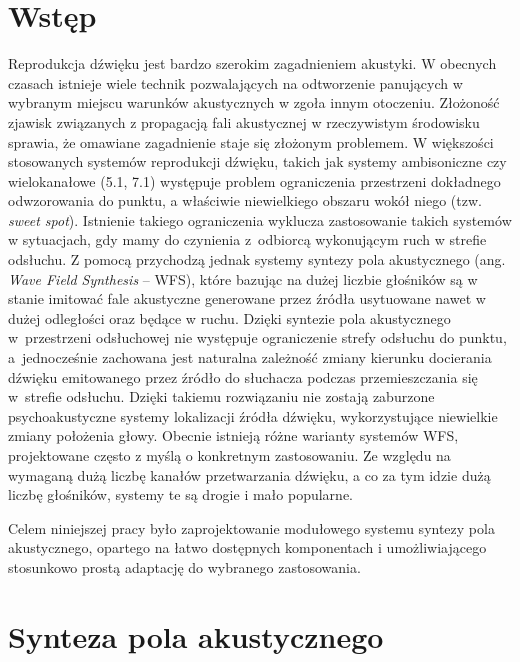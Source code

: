 \documentclass[12pt]{oska}
\affiliation{Akademia Górniczo-Hutnicza im. Stanisława Staszica w Krakowie}
\let\Oldsection\section
\renewcommand{\section}{\FloatBarrier\Oldsection}
\begin{document}
\maketitles

\section{Wstęp}

Reprodukcja dźwięku jest bardzo szerokim zagadnieniem akustyki. W obecnych
czasach istnieje wiele technik pozwalających na odtworzenie panujących w
wybranym miejscu warunków akustycznych w zgoła innym otoczeniu. Złożoność
zjawisk związanych z propagacją fali akustycznej w rzeczywistym środowisku
sprawia, że omawiane zagadnienie staje się złożonym problemem. 
W większości stosowanych systemów reprodukcji dźwięku, takich jak systemy 
ambisoniczne czy wielokanałowe (5.1, 7.1) występuje problem
ograniczenia przestrzeni dokładnego odwzorowania do
punktu, a właściwie niewielkiego obszaru wokół niego (tzw. \textit{sweet spot}).
Istnienie takiego ograniczenia wyklucza zastosowanie takich systemów w
sytuacjach, gdy mamy do czynienia z~odbiorcą wykonującym ruch w strefie
odsłuchu. Z pomocą przychodzą jednak systemy syntezy pola akustycznego (ang. \textit{Wave
Field Synthesis} -- WFS), które bazując na dużej liczbie głośników są w stanie
imitować fale akustyczne generowane przez źródła usytuowane nawet w dużej
odległości oraz będące w ruchu. Dzięki syntezie pola akustycznego w~przestrzeni odsłuchowej nie występuje ograniczenie strefy
odsłuchu do punktu, a~jednocześnie zachowana jest naturalna zależność zmiany kierunku docierania dźwięku emitowanego przez źródło do słuchacza podczas przemieszczania się w~strefie odsłuchu. Dzięki takiemu rozwiązaniu nie zostają zaburzone psychoakustyczne systemy lokalizacji źródła dźwięku, wykorzystujące niewielkie zmiany położenia głowy. Obecnie istnieją różne warianty systemów WFS, projektowane często z myślą o konkretnym zastosowaniu. Ze względu na wymaganą dużą liczbę kanałów przetwarzania dźwięku, a co za tym idzie dużą liczbę głośników, systemy te są drogie i mało popularne. 

Celem niniejszej pracy
było zaprojektowanie modułowego systemu syntezy pola akustycznego, opartego na
łatwo dostępnych komponentach i umożliwiającego stosunkowo prostą adaptację do
wybranego zastosowania.

\section{Synteza pola akustycznego}
\end{document}
